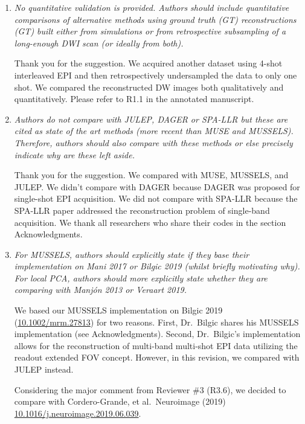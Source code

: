 \documentclass[a4paper,11pt,twoside]{report}
\begin{document}
\begin{enumerate}
    \item \textit{No quantitative validation is provided. Authors should include quantitative comparisons of alternative methods using ground truth (GT) reconstructions (GT) built either from simulations or from retrospective subsampling of a long-enough DWI scan (or ideally from both).}

    \hspace{1em} Thank you for the suggestion.
    We acquired another dataset using 4-shot interleaved EPI
    and then retrospectively undersampled the data to only one shot.
    We compared the reconstructed DW images
    both qualitatively and quantitatively.
    Please refer to R1.1 in the annotated manuscript.

    \item \textit{Authors do not compare with JULEP, DAGER or SPA-LLR but these are cited as state of the art methods (more recent than MUSE and MUSSELS). Therefore, authors should also compare with these methods or else precisely indicate why are these left aside.}

    \hspace{1em} Thank you for the suggestion.
    We compared with MUSE, MUSSELS, and JULEP.
    We didn't compare with DAGER
    because DAGER was proposed for single-shot EPI acquisition.
    We did not compare with SPA-LLR because
    the SPA-LLR paper addressed the reconstruction problem
    of single-band acquisition.
    We thank all researchers who share their codes
    in the section Acknowledgments.

    \item \textit{For MUSSELS, authors should explicitly state if they base their implementation on Mani 2017 or Bilgic 2019 (whilst briefly motivating why). For local PCA, authors should more explicitly state whether they are comparing with Manjón 2013 or Veraart 2019.}

    \hspace{1em} We based our MUSSELS implementation on
    Bilgic 2019 (\href{https://doi.org/10.1002/mrm.27813}{10.1002/mrm.27813}) for two reasons.
    First, Dr.~Bilgic shares his MUSSELS implementation
    (see Acknowledgments).
    Second, Dr.~Bilgic's implementation allows for the reconstruction of
    multi-band multi-shot EPI data
    utilizing the readout extended FOV concept.
    However, in this revision, we compared with JULEP instead.

    \hspace{1em} Considering the major comment from Reviewer \#3 (R3.6),
    we decided to compare with Cordero-Grande, et al.~Neuroimage (2019)
    \href{https://doi.org/10.1016/j.neuroimage.2019.06.039}{10.1016/j.neuroimage.2019.06.039}.


\end{enumerate}
\end{document}
